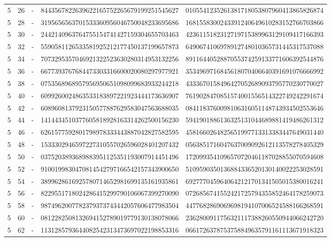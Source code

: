 \begin{longtable}{rrrll}
5 & 26 & - & 8443567822639622165752265679199251545627 & 0105541235261381718053807960413865826874 \\
5 & 28 & - & 3195656563701533360956046750048233695686 & 1681558300243391240649610283152766703866 \\
5 & 30 & - & 2442140963764755154741427159304655703463 & 4236115182312719715389963129109417166393 \\
5 & 32 & - & 5590581126533581925212177450137199657873 & 6490674106978912748010365731445317537088 \\
5 & 34 & - & 7073295357046921322523630280314953132256 & 8911644052887055374259133771606392544876 \\
5 & 36 & - & 6677393767684473303316600020080297977921 & 3534969716845618070406640391691076666992 \\
5 & 38 & - & 0753568968957956950651098099683933244218 & 4333670158496427052689093795770230770027 \\
5 & 40 & - & 6099260024863533183897221923444173636907 & 7619028470851574001556514322749242291674 \\
5 & 42 & - & 6089608137923150577887629583047563688035 & 0841183760098106316051148743934502553646 \\
5 & 44 & - & 1414434510377605818928163314262500156230 & 5941901886136325131044689881419486261312 \\
5 & 46 & - & 6261577592801798978333443887042827582595 & 4581660264825651997713313383447649031440 \\
5 & 48 & - & 1533302946597227310557026596028401207432 & 0563851716047637009092612113578278405329 \\
5 & 50 & - & 0375203893689883951125351193007914451496 & 1720993541096570720461187028855070594608 \\
5 & 52 & - & 9100199830470814542797166542157343900650 & 5109590350136884336520130140022253028591 \\
5 & 54 & - & 3899628616925780714652981699135161935861 & 6927770459640642121701341505015380016241 \\
5 & 56 & - & 8229551718024286415299790106067399270090 & 0726856741552421725794355852464178259073 \\
5 & 58 & - & 9874962007782379373743442057606477983504 & 4477682869069698194107006524588166268591 \\
5 & 60 & - & 0812282508132694152789019779130138078066 & 2362800911756321117388260550944066242720 \\
5 & 62 & - & 1131285793644082542313473697022198853316 & 0661726378753758849635791161113671918323 \\

\end{longtable}
